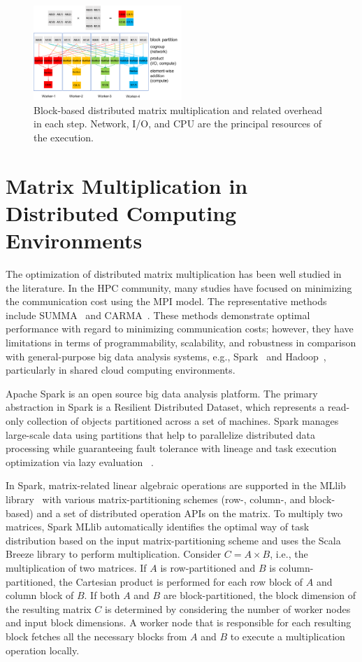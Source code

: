 \documentclass[10pt, conference, compsocconf]{IEEEtran}
\begin{document}
\begin{figure}[ht]
	\centering\includegraphics[width=0.5\textwidth]{figures/matmult-overhead-non-square-1.pdf}\caption{Block-based distributed matrix multiplication and related overhead in each step. Network, I/O, and CPU are the principal resources of the execution.}\label{fig:matmul-with-overhead}
\end{figure}

\section{Matrix Multiplication in Distributed Computing Environments}\label{sec:distributed-matrix-computation}
The optimization of distributed matrix multiplication has been well studied in the literature. In the HPC community, many studies have focused on minimizing the communication cost using the MPI model. The representative methods include SUMMA~\cite{summa} and CARMA~\cite{carma}. These methods demonstrate optimal performance with regard to minimizing communication costs; however, they have limitations in terms of programmability, scalability, and robustness in comparison with general-purpose big data analysis systems, e.g., Spark~\cite{spark} and Hadoop~\cite{hadoop}, particularly in shared cloud computing environments.

Apache Spark is an open source big data analysis platform. The primary abstraction in Spark is a Resilient Distributed Dataset, which represents a read-only collection of objects partitioned across a set of machines. Spark manages large-scale data using partitions that help to parallelize distributed data processing while guaranteeing fault tolerance with lineage and task execution optimization via lazy evaluation ~\cite{spark}.

In Spark, matrix-related linear algebraic operations are supported in the MLlib library~\cite{spark-mm} with various matrix-partitioning schemes (row-, column-, and block-based) and a set of distributed operation APIs on the matrix. To multiply two matrices, Spark MLlib automatically identifies the optimal way of task distribution based on the input matrix-partitioning scheme and uses the Scala Breeze library to perform multiplication. Consider $C = A \times B$, i.e., the multiplication of two matrices. If $A$ is row-partitioned and $B$ is column-partitioned, the Cartesian product is performed for each row block of $A$ and column block of $B$. If both $A$ and $B$ are block-partitioned, the block dimension of the resulting matrix $C$ is determined by considering the number of worker nodes and input block dimensions. A worker node that is responsible for each resulting block fetches all the necessary blocks from $A$ and $B$ to execute a multiplication operation locally.
\end{document}
